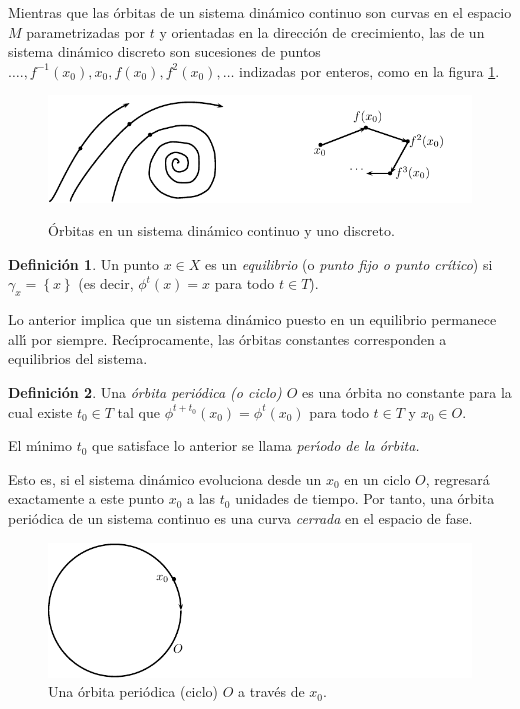 \documentclass[11pt]{book}
\theoremstyle{definition}
\newtheorem{definition}{Definición}
\numberwithin{definition}{section}
\theoremstyle{theorem}
\numberwithin{theorem}{section}
\numberwithin{lemma}{section}
\numberwithin{corollary}{section}
\theoremstyle{plain}
\numberwithin{example}{section}
\begin{document}
Mientras que las \'orbitas de un sistema din\'amico continuo son curvas en el
espacio $M$ parametrizadas por $t$ y orientadas en la direcci\'on de
crecimiento, las de un sistema din\'amico discreto son sucesiones de puntos
$\ldots ., f^{- 1} \left( x_0 \right), x_0, f \left( x_0 \right), f^2 \left(
x_0 \right), \ldots$ indizadas por enteros, como en la figura \ref{fig:orbits}.

\begin{figure}[ht] \centering \label{fig:orbits}
    \includegraphics[scale=1.3]{figures/orbits-continuousanddiscrete.pdf}
    \caption{Órbitas en un sistema dinámico continuo y uno discreto.}
\end{figure}

\begin{definition}
  \label{def:equilibrium}Un punto $x \in X$ es un {\emph{equilibrio}} (o
  {\emph{punto fijo o punto crítico}}) si $\gamma_x = \left\{ x \right\}$ (es decir,
  $\phi^t \left( x \right) = x$ para todo $t \in T$).
\end{definition}

Lo anterior implica que un sistema din\'amico puesto en un equilibrio permanece all\'{\i} por siempre. Rec\'{\i}procamente, las \'orbitas constantes corresponden a equilibrios del sistema.

\begin{definition}
  \label{def:periodicorbit}Una {\emph{\'orbita peri\'odica (o ciclo) $O$}}
  es una \'orbita no constante para la cual existe $t_0 \in T$ tal que
  $\phi^{t + t_0} \left( x_0 \right) = \phi^t \left( x_0 \right)$ para todo $t
  \in T$ y $x_0 \in O$.
  
  El m\'{\i}nimo $t_0$ que satisface lo anterior se llama
  {\emph{per\'{\i}odo de la \'orbita.}}
\end{definition}

Esto es, si el sistema din\'amico evoluciona desde un $x_0$ en un ciclo $O$,
regresar\'a exactamente a este punto $x_0$ a las $t_0$ unidades de tiempo. Por
tanto, una \'orbita peri\'odica de un sistema continuo es una curva
{\emph{cerrada}} en el espacio de fase.

\begin{figure}[!hb] \label{fig:cycle} \centering
    \includegraphics[scale=1.3]{figures/orbit-cycle.pdf}
    \caption{Una órbita periódica (ciclo) $O$ a través de $x_0$.}
\end{figure}
\end{document}
